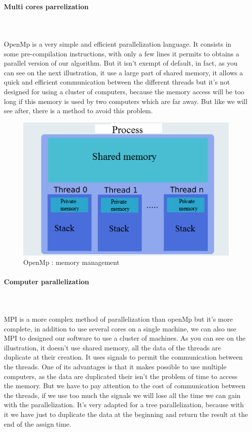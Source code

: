 \paragraph{Multi cores parrelization}\mbox{}\\\mbox{}\\
	OpenMp is a very simple and efficient parallelization language. It consists in some pre-compilation instructions, with only a few lines it permits to obtains a parallel version of our algorithm. But it isn't exempt of default, in fact, as you can see on the next illustration, it use a large part of shared memory, it allows a quick and efficient communication between the different threads but it's not designed for using a cluster of computers, because the memory access will be too long if this memory is used by two computers which are far away. But like we will see after, there is a method to avoid this problem.
\begin{figure}[!h] 
\centerline{\includegraphics[scale=0.50]{3_Software_considered/MultithreadingMP_boost_Visual_MPI_5000_Zotero_Project_Baptiste/OpenMP}}
   \caption{\label{étiquette} OpenMp : memory management}
\end{figure}
\newpage
\paragraph{Computer parallelization}\mbox{}\\\mbox{}\\
	MPI is a more complex method of parallelization than openMp but it's more complete, in addition to use several cores on a single machine, we can also use MPI to designed our software to use a cluster of machines. As you can see on the illustration, it doesn't use shared memory, all the data of the threads are duplicate at their creation. It uses signals to permit the communication between the threads. One of its advantages is that it makes possible to use multiple computers, as the data are duplicated their isn't the problem of time to access the memory. But we have to pay attention to the cost of communication between the threads, if we use too much the signals we will lose all the time we can gain with the parallelization. It's very adapted for a tree parallelization, because with it we have just to duplicate the data at the beginning and return the result at the end of the assign time.

